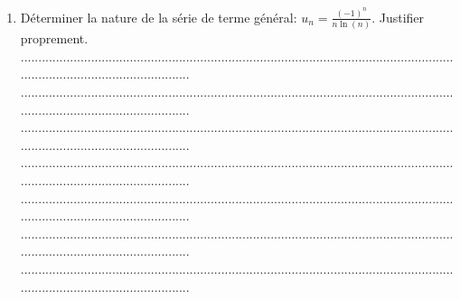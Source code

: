 \documentclass{article}
\begin{document}
\begin{footnotesize}
\begin{enumerate}
    ...........................................................................................................................................................................\newline
    ...........................................................................................................................................................................\newline
    ...........................................................................................................................................................................\newline
    ...........................................................................................................................................................................\newline\newline
    \item Déterminer la nature de la série de terme général: $u_{n} = \frac{(-1)^{n}}{n\ln(n)}$. Justifier proprement.\newline\newline
    ...........................................................................................................................................................................\newline
    ...........................................................................................................................................................................\newline
    ...........................................................................................................................................................................\newline
    ...........................................................................................................................................................................\newline
    ...........................................................................................................................................................................\newline
    ...........................................................................................................................................................................\newline
    ...........................................................................................................................................................................\newline

\end{enumerate}
\end{footnotesize}
\end{document}
